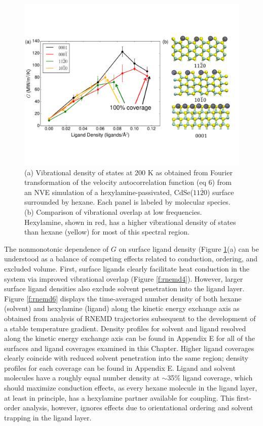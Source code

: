 \begin{figure}
\begin{center}
\includegraphics[width=\textwidth]{./Chapter4/rnemd5.pdf}
\caption[Dependence of interfacial thermal conductance on extent of surface passivation for a CdSe/hexylamine/hexane interface.]{(a) Vibrational density of states at 200 K as obtained from Fourier transformation of the velocity autocorrelation function (eq 6) from an NVE simulation of a hexylamine-passivated, CdSe($11\bar{2}0$) surface surrounded by hexane. Each panel is labeled by molecular species. (b) Comparison of vibrational overlap at low frequencies. Hexylamine, shown in red, has a higher vibrational density of states than hexane (yellow) for most of this spectral region.}
\label{f:rnemd5}
\end{center}
\end{figure}

The nonmonotonic dependence of $G$ on surface ligand density (Figure \ref{f:rnemd5}(a) can be understood as a balance of competing effects related to conduction, ordering, and excluded volume. First, surface ligands clearly facilitate heat conduction in the system via improved vibrational overlap (Figure \ref{f:rnemd4}). However, larger surface ligand densities also exclude solvent penetration into the ligand layer. Figure \ref{f:rnemd6} displays the time-averaged number density of both hexane (solvent) and hexylamine (ligand) along the kinetic energy exchange axis as obtained from analysis of RNEMD trajectories subsequent to the development of a stable temperature gradient. Density profiles for solvent and ligand resolved along the kinetic energy exchange axis can be found in Appendix E for all of the surfaces and ligand coverages examined in this Chapter. Higher ligand coverages clearly coincide with reduced solvent penetration into the same region; density profiles for each coverage can be found in Appendix E. Ligand and solvent molecules have a roughly equal number density at $\sim$35\% ligand coverage, which should maximize conduction effects, as every hexane molecule in the ligand layer, at least in principle, has a hexylamine partner available for coupling. This first-order analysis, however, ignores effects due to orientational ordering and solvent trapping in the ligand layer. \par

